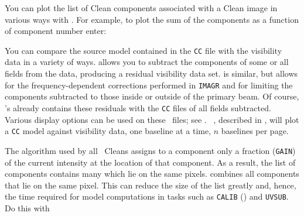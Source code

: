      You can plot the list of Clean components associated with a Clean
image in various ways with {\tt {}}\@.  For example, to
plot the sum of the components as a function of component number
enter:

     You can compare the source model contained in the {\tt CC} file
with the visibility data in a variety of ways.  {\tt {}}
allows you to subtract the components of some or all fields from the
data, producing a residual visibility data set.  {\tt {}} is
similar, but allows for the frequency-dependent corrections performed
in {\tt IMAGR} and for limiting the components subtracted to those
inside or outside of the primary beam.  Of course, {\tt
{}}'s  already contains these residuals with
the {\tt CC} files of all fields subtracted.  Various display options
can be used on these \uv\ files; see .  {\tt
{}}, described in , will plot a {\tt CC} model
against visibility data, one baseline at a time, $n$ baselines per
page.

     The algorithm used by all \AIPS\ Cleans assigns to a component
only a fraction ({\tt GAIN}) of the current intensity at the location
of that component.  As a result, the list of components contains many
which lie on the same pixels.  {\tt {}} combines all
components that lie on the same pixel.  This can reduce the size of
the list greatly and, hence, the time required for model computations
in tasks such as {\tt CALIB} () and {\tt UVSUB}\@.
Do this with

